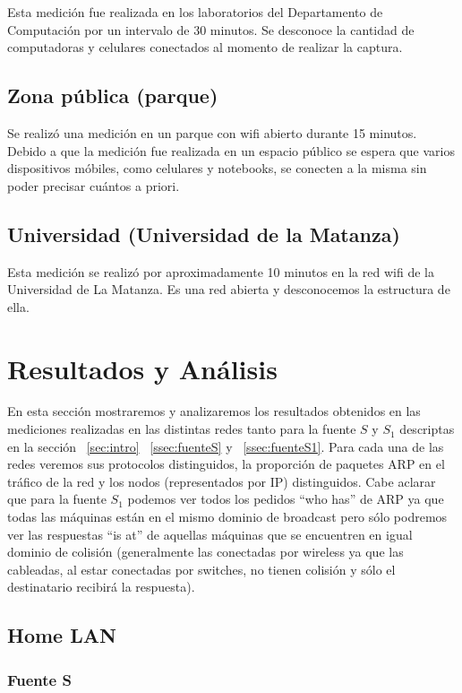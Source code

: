 \documentclass[final,inline,narroweqnarray,a4paper]{ieee}
\begin{document}
Esta medición fue realizada en los laboratorios del Departamento de Computación por un intervalo de 30 minutos. Se desconoce la cantidad de computadoras y celulares conectados al momento de realizar la captura.

\subsection{Zona pública (parque)}
Se realizó una medición en un parque con wifi abierto durante 15 minutos. Debido a que la medición fue realizada en un espacio público se espera que varios dispositivos móbiles, como celulares y notebooks, se conecten a la misma sin poder precisar cuántos a priori.

\subsection{Universidad (Universidad de la Matanza)}
Esta medición se realizó por aproximadamente 10 minutos en la red wifi de la Universidad de La Matanza. Es una red abierta y desconocemos la estructura de ella.

\section{Resultados y Análisis}
En esta sección mostraremos y analizaremos los resultados obtenidos en las mediciones realizadas en las distintas redes tanto para la fuente $S$ y $S_1$ descriptas en la sección ~\ref{sec:intro} ~\ref{ssec:fuenteS} y ~\ref{ssec:fuenteS1}. Para cada una de las redes veremos sus protocolos distinguidos, la proporción de paquetes ARP en el tráfico de la red y los nodos (representados por IP) distinguidos. Cabe aclarar que para la fuente $S_1$ podemos ver todos los pedidos ``who has'' de ARP ya que todas las máquinas están en el mismo dominio de broadcast pero sólo podremos ver las respuestas ``is at'' de aquellas máquinas que se encuentren en igual dominio de colisión (generalmente las conectadas por wireless ya que las cableadas, al estar conectadas por switches, no tienen colisión y sólo el destinatario recibirá la respuesta). 

\subsection{Home LAN}
\subsubsection{Fuente S}
\end{document}
